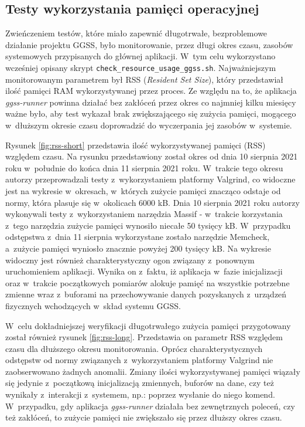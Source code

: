 \subsection{Testy wykorzystania pamięci operacyjnej}

Zwieńczeniem testów, które miało zapewnić długotrwałe, bezproblemowe działanie projektu GGSS, było monitorowanie, przez długi okres czasu, zasobów systemowych przypisanych do głównej aplikacji. W~tym celu wykorzystano wcześniej opisany skrypt \lstinline{check_resource_usage_ggss.sh}. Najważniejszym monitorowanym parametrem był RSS (\emph{Resident Set Size}), który przedstawiał ilość pamięci RAM wykorzystywanej przez proces. Ze względu na to, że aplikacja \emph{ggss-runner} powinna działać bez zakłóceń przez okres co najmniej kilku miesięcy ważne było, aby test wykazał brak zwiększającego się zużycia pamięci, mogącego w~dłuższym okresie czasu doprowadzić do wyczerpania jej zasobów w~systemie.

Rysunek \ref{fig:rss-short} przedstawia ilość wykorzystywanej pamięci (RSS) względem czasu. Na rysunku przedstawiony został okres od dnia 10 sierpnia 2021 roku w~południe do końca dnia 11 sierpnia 2021 roku. W~trakcie tego okresu autorzy przeprowadzali testy z~wykorzystaniem platformy Valgrind, co widoczne jest na wykresie w~okresach, w~których zużycie pamięci znacząco odstaje od normy, która plasuje się w~okolicach 6000 kB. Dnia 10 sierpnia 2021 roku autorzy wykonywali testy z~wykorzystaniem narzędzia Massif - w~trakcie korzystania z~tego narzędzia zużycie pamięci wynosiło niecałe 50 tysięcy kB. W~przypadku odstępstwa z~dnia 11 sierpnia wykorzystane zostało narzędzie Memcheck, a~zużycie pamięci wyniosło znacznie powyżej 200 tysięcy kB. Na wykresie widoczny jest również charakterystyczny ogon związany z~ponownym uruchomieniem aplikacji. Wynika on z~faktu, iż aplikacja w~fazie inicjalizacji oraz w~trakcie początkowych pomiarów alokuje pamięć na wszystkie potrzebne zmienne wraz z~buforami na przechowywanie danych pozyskanych z~urządzeń fizycznych wchodzących w~skład systemu GGSS.

W~celu dokładniejszej weryfikacji długotrwałego zużycia pamięci przygotowany został również rysunek \ref{fig:rss-long}. Przedstawia on parametr RSS względem czasu dla dłuższego okresu monitorowania. Oprócz charakterystycznych odstępstw od normy związanych z~wykorzystaniem platformy Valgrind nie zaobserwowano żadnych anomalii. Zmiany ilości wykorzystywanej pamięci wiązały się jedynie z~początkową inicjalizacją zmiennych, buforów na dane, czy też wynikały z~interakcji z~systemem, np.: poprzez wysłanie do niego komend. W~przypadku, gdy aplikacja \emph{ggss-runner} działała bez zewnętrznych poleceń, czy też zakłóceń, to zużycie pamięci nie zwiększało się przez dłuższy okres czasu.

